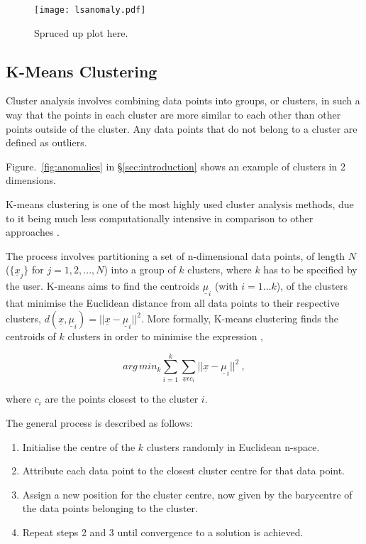 \begin{figure}[t]
    \texttt{[image: lsanomaly.pdf]}
    \caption[Least Squares Anomaly Score]{Spruced up plot here.}
    \label{fig:lsanomaly}
\end{figure}

\subsection{K-Means Clustering}
\label{subsec:kmeans}

Cluster analysis involves combining data points into groups, or clusters, in such a way that the points in each cluster are more similar to each other than other points outside of the cluster. Any data points that do not belong to a cluster are defined as outliers. 

Figure.~\ref{fig:anomalies} in \S \ref{sec:introduction} shows an example of clusters in 2 dimensions. 

K-means clustering is one of the most highly used cluster analysis methods, due to it being much less computationally intensive in comparison to other approaches \cite{Kanungo:2002:EKC:628329.628801}.

The process involves partitioning a set of n-dimensional data points, of length $N$ ($\{\underline{x}_j\}$ for $j=1,2,...,N$) into a group of $k$ clusters, where $k$ has to be specified by the user. K-means aims to find the centroids $\underline{\mu}_i$ (with $i=1...k$), of the clusters that minimise the Euclidean distance from all data points to their respective clusters, $d(\underline{x}, \underline{\mu}_i) = ||\underline{x}-\underline{\mu}_i||^2$. More formally, K-means clustering finds the centroids of $k$ clusters in order to minimise the expression \cite{596afe3f2b5a4ff3b8f4f9793ad2f4ee},

\begin{equation}
    arg\,min_k \sum_{i=1}^{k} \sum_{\underline{x} \epsilon c_i} ||\underline{x}-\underline{\mu}_i||^2 ~,
    \label{eq:K-means}
\end{equation}

where $c_i$ are the points closest to the cluster $i$.

The general process is described as follows:
\begin{enumerate}
    \item Initialise the centre of the $k$ clusters randomly in Euclidean n-space.
    \item Attribute each data point to the closest cluster centre for that data point. 
    \item Assign a new position for the cluster centre, now given by the barycentre of the data points belonging to the cluster.
    \item Repeat steps 2 and 3 until convergence to a solution is achieved.
\end{enumerate}

